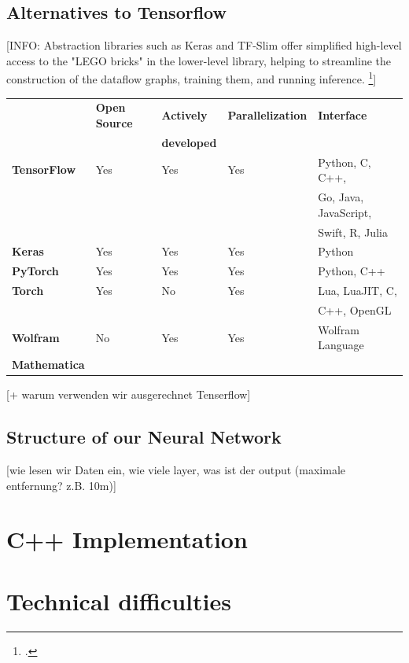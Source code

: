 \subsection{Alternatives to Tensorflow}
[INFO: Abstraction libraries such as Keras and TF-Slim offer simplified  high-level  access  to  the  "LEGO  bricks"  in  the  lower-level  library,  helping  to streamline the construction of the dataflow graphs, training them, and running inference. \footcite[page 7]{Hope_Learning_TensorFlow}]

\begin{center}
\begin{tabular}{| l | l | l | l | l |}
	\hline
	\bfseries & \bfseries Open Source & \bfseries Actively & \bfseries Parallelization & \bfseries Interface \\
	 & & \bfseries developed & & \\
	\hline
	\bfseries TensorFlow & Yes & Yes & Yes & Python, C, C++, \\
	& & & & Go, Java, JavaScript, \\
	& & & & Swift, R, Julia \\
	\hline
	\bfseries Keras & Yes & Yes & Yes & Python \\
	\hline
	\bfseries PyTorch & Yes & Yes & Yes & Python, C++ \\
	\hline
	\bfseries Torch & Yes & No & Yes & Lua, LuaJIT, C, \\
	& & & & C++, OpenGL \\
	\hline
	\bfseries Wolfram & No & Yes & Yes & Wolfram Language \\
	\bfseries Mathematica & & & & \\
	\hline
\end{tabular}
\label{tab:implementation_tensorflow_alternativesToTensorflow_comparision}
\end{center}

[+ warum verwenden wir ausgerechnet Tenserflow]

\subsection{Structure of our Neural Network}

[wie lesen wir Daten ein, wie viele layer, was ist der output (maximale entfernung? z.B. 10m)]

\section{C++ Implementation}

\section{Technical difficulties}

\filbreak